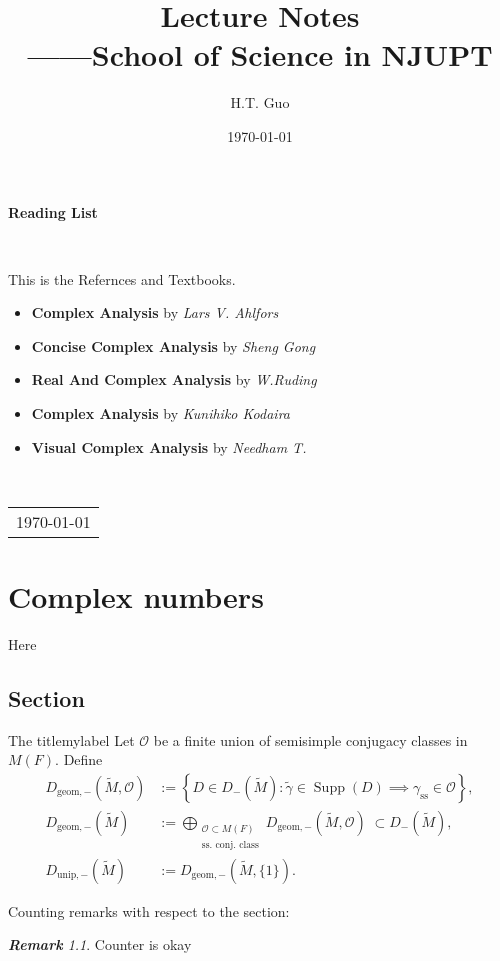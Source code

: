 \documentclass[11pt, a4paper, openany]{book}
\title{{\Huge{\textbf{Lecture Notes}}}\\——School of Science in NJUPT}
\author{H.T. Guo}
\date{\today}
\newenvironment{Proof of claim}
  {\renewcommand\qedsymbol{$\blacksquare$}\begin{proof}[Proof of claim]}
  {\end{proof}}
\newcommand{\Supp}{\operatorname{Supp}}
\theoremstyle{remark}
\newtheorem{remark}[]{\bfseries Remark}          %
\newcounter{theo}[subsection]
\theoremstyle{remark}
\theoremstyle{remark}
\theoremstyle{remark}
\begin{document}
\maketitle

\setcounter{page}{1}

\begin{center}
    \Huge\textbf{Reading List}
\end{center}~\

This is the Refernces and Textbooks.
\begin{itemize}
	\item \textbf{Complex Analysis} by \textit{Lars V. Ahlfors}
	\item \textbf{Concise Complex Analysis} by \textit{Sheng Gong}
        \item \textbf{Real And Complex Analysis} by \textit{W.Ruding}
        \item \textbf{Complex Analysis} by \textit{Kunihiko Kodaira}
        \item \textbf{Visual Complex Analysis} by \textit{Needham T.}
        
\end{itemize}
~\\
\begin{flushright}
    \begin{tabular}{c}
        \\
        \today
    \end{tabular}
\end{flushright}

\newpage
{}
\setcounter{page}{1}
\newpage
\setcounter{page}{1}
\tableofcontents

\chapter{Complex numbers}

Here

\section{Section}
\begin{Definition}{The title}{mylabel}
	Let $\mathcal{O}$ be a finite union of semisimple conjugacy classes in $M(F)$. Define
	\begin{align*}
		D_{\mathrm{geom},-}(\tilde{M}, \mathcal{O}) & := \left\{ D \in D_-(\tilde{M}) : \tilde{\gamma} \in \Supp(D) \implies \gamma_{\text{ss}} \in \mathcal{O} \right\}, \\
		D_{\mathrm{geom}, -}(\tilde{M}) & := \bigoplus_{\substack{\mathcal{O} \subset M(F) \\ \text{ss.\ conj.\ class} }} D_{\mathrm{geom},-}(\tilde{M}, \mathcal{O}) \; \subset D_-(\tilde{M}), \\
		D_{\mathrm{unip}, -}(\tilde{M}) & := D_{\mathrm{geom}, -}(\tilde{M}, \{1\}).
	\end{align*}
\end{Definition}
Counting remarks with respect to the section:
\begin{remark}
Counter is okay
\end{remark}
\end{document}
